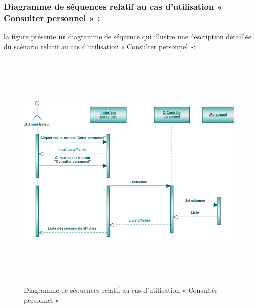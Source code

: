 \documentclass[12 pt ]{report}
\begin{document}
\subsubsection{Diagramme de séquences relatif au cas d’utilisation « Consulter personnel » :}
la figure   présente un diagramme de séquence qui illustre une description détaillée du scénario relatif au cas d’utilisation « Consulter personnel »: 
\begin{figure}[h]
 \begin{center}
\includegraphics[width= 16 cm ,height=  12cm]{sec_cons_per.PNG}
\caption{Diagramme de séquences relatif au cas d’utilisation « Consulter personnel  »}

\end{center}
\end{figure}
\newpage
\end{document}
